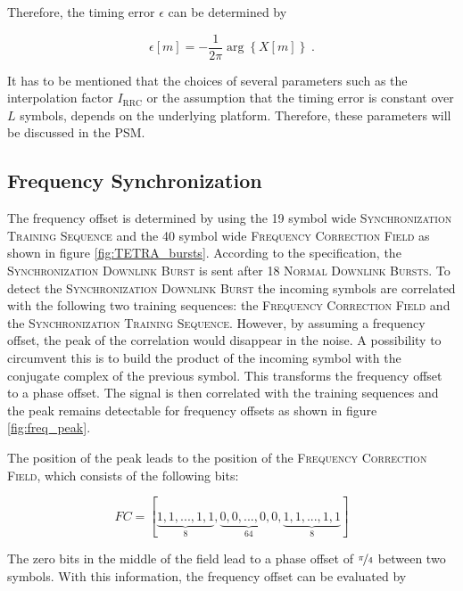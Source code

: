 Therefore, the timing error $\epsilon$ can be determined by

\begin{equation}
\epsilon[m] = - \frac{1}{2\pi} \arg \left\{X[m]\right\}\;.
\end{equation}

It has to be mentioned that the choices of several parameters such as the interpolation factor $I_\text{RRC}$ or the assumption that the timing error is constant over $L$ symbols, depends on the underlying platform. Therefore, these parameters will be discussed in the \ac{PSM}.  


\subsection{Frequency Synchronization}

The frequency offset is determined by using the 19 symbol wide \textsc{Synchronization Training Sequence} and the 40 symbol wide \textsc{Frequency Correction Field} as shown in figure \ref{fig:TETRA_bursts}. According to the specification, the \textsc{Synchronization Downlink Burst} is sent after 18 \textsc{Normal Downlink Bursts}. To detect the \textsc{Synchronization Downlink Burst} the incoming symbols are correlated with the following two training sequences: the \textsc{Frequency Correction Field} and the \textsc{Synchronization Training Sequence}. However, by assuming a frequency offset, the peak of the correlation would disappear in the noise. A possibility to circumvent this is to build the product of the incoming symbol with the conjugate complex of the previous symbol. This transforms the frequency offset to a phase offset. The signal is then correlated with the training sequences and the peak remains detectable for frequency offsets as shown in figure \ref{fig:freq_peak}.

The position of the peak leads to the position of the \textsc{Frequency Correction Field}, which consists of the following bits: 

\begin{equation*}
FC = [\underbrace{1,1,...,1,1}_{8},\underbrace{0,0,...,0,0}_{64},\underbrace{1,1,...,1,1}_{8}]
\end{equation*}

The zero bits in the middle of the field lead to a phase offset of $\nicefrac{\pi}{4}$ between two symbols. With this information, the frequency offset can be evaluated by


